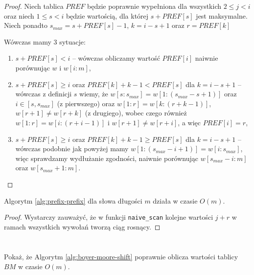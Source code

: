 \begin{proof}
  Niech tablica $PREF$ będzie poprawnie wypełniona dla wszystkich $2 \le j < i$ oraz niech $1 \le s < i$ będzie wartością, dla której $s + PREF[s]$ jest maksymalne.
  Niech ponadto $s_{max} = s + PREF[s] - 1$, $k = i - s + 1$ oraz $r = PREF[k]$
  
  Wówczas mamy 3 sytuacje:
  \begin{enumerate}
      \item $s + PREF[s] < i$ -- wówczas obliczamy wartość $PREF[i]$ naiwnie porównując $w$ i $w[i:m]$,
      \item $s + PREF[s] \ge i$ oraz $PREF[k] + k - 1 < PREF[s]$ dla $k = i - s + 1$ -- wówczas z definicji $s$ wiemy, że $w[s:s_{max}] = w[1:(s_{max} - s + 1)]$ oraz $i \in [s, s_{max}]$ (z pierwszego) oraz $w[1:r] = w[k:(r + k - 1)]$, $w[r + 1] \neq w[r + k]$ (z drugiego), wobec czego również $w[1:r] = w[i:(r + i - 1)]$ i $w[r + 1] \neq w[r + i]$, a więc $PREF[i] = r$,
      \item $s + PREF[s] \ge i$ oraz $PREF[k] + k - 1 \ge PREF[s]$ dla $k = i - s + 1$ -- wówczas podobnie jak powyżej mamy $w[1:(s_{max} - i + 1)] = w[i:s_{max}]$, więc sprawdzamy wydłużanie zgodności, naiwnie porównując $w[s_{max} - i:m]$ oraz $w[s_{max} + 1:m]$.
  \end{enumerate}
\end{proof}

\begin{theorem}{}{}
  Algorytm \ref{alg:prefix-prefix} dla słowa długości $m$ działa w czasie $O(m)$.
\end{theorem}

\begin{proof}
  Wystarczy zauważyć, że w funkcji \texttt{naive\_scan} kolejne wartości $j + r$ w ramach wszystkich wywołań tworzą ciąg rosnący.
\end{proof}

\begin{code}
\inputminted{python}{code/other/maximum-suffixes.py}
\label{alg:maximum-suffixes}
\end{code}

\begin{code}
\inputminted{python}{code/other/boyer-moore-shift.py}
\label{alg:boyer-moore-shift}
\end{code}

\begin{problem}{}{}
  Pokaż, że Algorytm \ref{alg:boyer-moore-shift} poprawnie oblicza wartości tablicy $BM$ w czasie $O(m)$.
\end{problem}

